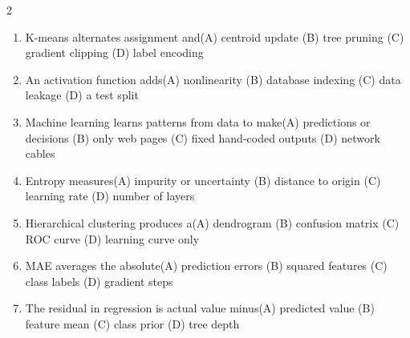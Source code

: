 \documentclass[a4paper]{article}
\begin{document}
\begin{multicols*}{2}
\begin{enumerate}
\item K-means alternates assignment and\newline\hspace*{0.6em}(A) centroid update \quad (B) tree pruning \newline\hspace*{0.6em}(C) gradient clipping \quad (D) label encoding
\item An activation function adds\newline\hspace*{0.6em}(A) nonlinearity \quad (B) database indexing \newline\hspace*{0.6em}(C) data leakage \quad (D) a test split
\item Machine learning learns patterns from data to make\newline\hspace*{0.6em}(A) predictions or decisions \quad (B) only web pages \newline\hspace*{0.6em}(C) fixed hand-coded outputs \quad (D) network cables
\item Entropy measures\newline\hspace*{0.6em}(A) impurity or uncertainty \quad (B) distance to origin \newline\hspace*{0.6em}(C) learning rate \quad (D) number of layers
\item Hierarchical clustering produces a\newline\hspace*{0.6em}(A) dendrogram \quad (B) confusion matrix \newline\hspace*{0.6em}(C) ROC curve \quad (D) learning curve only
\item MAE averages the absolute\newline\hspace*{0.6em}(A) prediction errors \quad (B) squared features \newline\hspace*{0.6em}(C) class labels \quad (D) gradient steps
\item The residual in regression is actual value minus\newline\hspace*{0.6em}(A) predicted value \quad (B) feature mean \newline\hspace*{0.6em}(C) class prior \quad (D) tree depth

\end{enumerate}
\end{multicols*}
\end{document}
